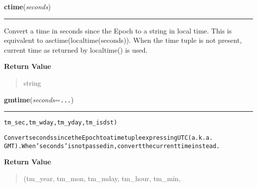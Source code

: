     \label{time:ctime}

    \vspace{0.5ex}

\hspace{.8\funcindent}\begin{boxedminipage}{\funcwidth}

    \raggedright \textbf{ctime}(\textit{seconds})

    \vspace{-1.5ex}

    \rule{\textwidth}{0.5\fboxrule}
\setlength{\parskip}{2ex}
    Convert a time in seconds since the Epoch to a string in local time. 
    This is equivalent to asctime(localtime(seconds)). When the time tuple 
    is not present, current time as returned by localtime() is used.

\setlength{\parskip}{1ex}
      \textbf{Return Value}
    \vspace{-1ex}

      \begin{quote}
      string

      \end{quote}

    \end{boxedminipage}

    \label{time:gmtime}

    \vspace{0.5ex}

\hspace{.8\funcindent}\begin{boxedminipage}{\funcwidth}

    \raggedright \textbf{gmtime}(\textit{seconds}={\tt ...})

    \vspace{-1.5ex}

    \rule{\textwidth}{0.5\fboxrule}
\setlength{\parskip}{2ex}
\begin{alltt}
                       tm\_sec, tm\_wday, tm\_yday, tm\_isdst)

Convert seconds since the Epoch to a time tuple expressing UTC (a.k.a.
GMT).  When 'seconds' is not passed in, convert the current time instead.
\end{alltt}

\setlength{\parskip}{1ex}
      \textbf{Return Value}
    \vspace{-1ex}

      \begin{quote}
      (tm\_year, tm\_mon, tm\_mday, tm\_hour, tm\_min,

      \end{quote}

    \end{boxedminipage}

